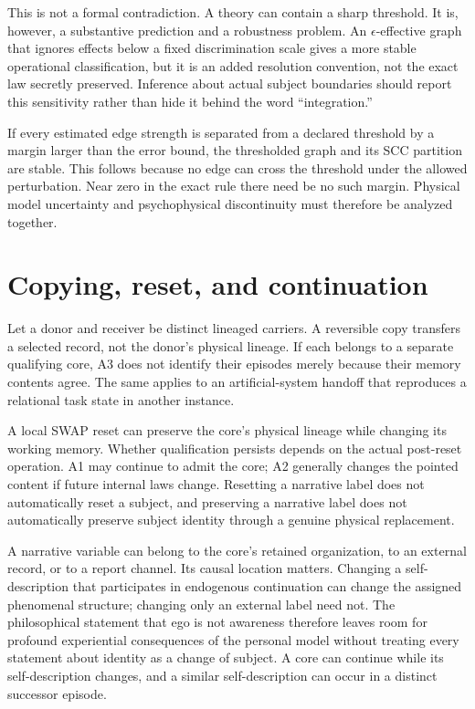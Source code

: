 This is not a formal contradiction. A theory can contain a sharp threshold. It is, however, a substantive prediction and a robustness problem. An $\epsilon$-effective graph that ignores effects below a fixed discrimination scale gives a more stable operational classification, but it is an added resolution convention, not the exact law secretly preserved. Inference about actual subject boundaries should report this sensitivity rather than hide it behind the word ``integration.''

If every estimated edge strength is separated from a declared threshold by a margin larger than the error bound, the thresholded graph and its SCC partition are stable. This follows because no edge can cross the threshold under the allowed perturbation. Near zero in the exact rule there need be no such margin. Physical model uncertainty and psychophysical discontinuity must therefore be analyzed together.

\section{Copying, reset, and continuation}\label{section:split:copying-reset-and-continuation}
Let a donor and receiver be distinct lineaged carriers. A reversible copy transfers a selected record, not the donor's physical lineage. If each belongs to a separate qualifying core, A3 does not identify their episodes merely because their memory contents agree. The same applies to an artificial-system handoff that reproduces a relational task state in another instance.

A local SWAP reset can preserve the core's physical lineage while changing its working memory. Whether qualification persists depends on the actual post-reset operation. A1 may continue to admit the core; A2 generally changes the pointed content if future internal laws change. Resetting a narrative label does not automatically reset a subject, and preserving a narrative label does not automatically preserve subject identity through a genuine physical replacement.

A narrative variable can belong to the core's retained organization, to an external record, or to a report channel. Its causal location matters. Changing a self-description that participates in endogenous continuation can change the assigned phenomenal structure; changing only an external label need not. The philosophical statement that ego is not awareness therefore leaves room for profound experiential consequences of the personal model without treating every statement about identity as a change of subject. A core can continue while its self-description changes, and a similar self-description can occur in a distinct successor episode.


